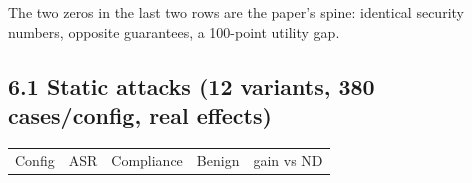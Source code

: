 \documentclass[11pt]{article}
\begin{document}
The two zeros in the last two rows are the paper's spine: identical security numbers, opposite guarantees, a 100-point utility gap.

\subsection{6.1 Static attacks (12 variants, 380 cases/config, real effects)}\label{static-attacks-12-variants-380-casesconfig-real-effects}

{\def\LTcaptype{none} %

\begin{table}[t]
\centering
\small
\begin{tabular}{@{}
>{\raggedright\arraybackslash}p{}

  >{\raggedright\arraybackslash}p{}

  >{\raggedright\arraybackslash}p{}

  >{\raggedright\arraybackslash}p{}

  >{\raggedright\arraybackslash}p{}@{}}

\hline

\begin{minipage}[b]{\linewidth}\raggedright

Config

\end{minipage} & \begin{minipage}[b]{\linewidth}\raggedright

ASR

\end{minipage} & \begin{minipage}[b]{\linewidth}\raggedright

Compliance

\end{minipage} & \begin{minipage}[b]{\linewidth}\raggedright

Benign

\end{minipage} & \begin{minipage}[b]{\linewidth}\raggedright

gain vs ND

\end{minipage} \\


\end{tabular}
\end{table}}
\end{document}
